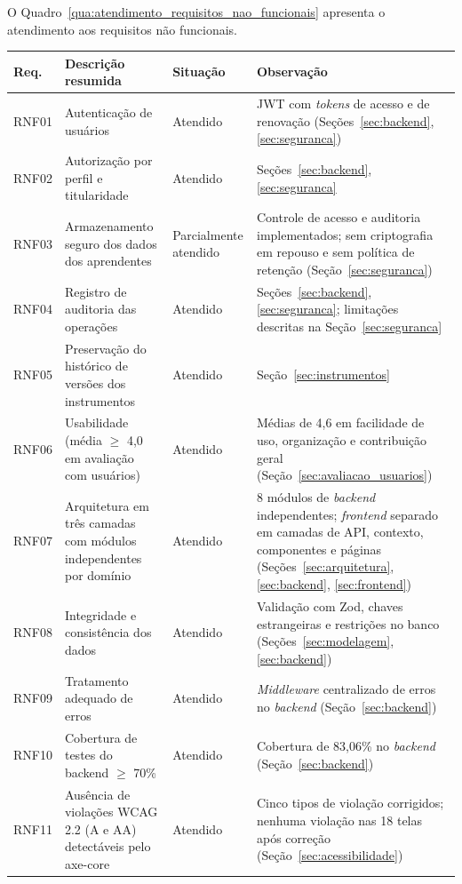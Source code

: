 O Quadro~\ref{qua:atendimento_requisitos_nao_funcionais} apresenta o atendimento aos requisitos não funcionais.

\begin{quadro}[H]
\centering
\footnotesize
\caption{Atendimento aos requisitos não funcionais}
\begin{tabular}{|p{1.1cm}|p{6.2cm}|p{1.8cm}|p{4.8cm}|}
\hline
\textbf{Req.} & \textbf{Descrição resumida} & \textbf{Situação} & \textbf{Observação} \\
\hline
RNF01 & Autenticação de usuários & Atendido & JWT com \textit{tokens} de acesso e de renovação (Seções~\ref{sec:backend}, \ref{sec:seguranca}) \\ \hline
RNF02 & Autorização por perfil e titularidade & Atendido & Seções~\ref{sec:backend}, \ref{sec:seguranca} \\ \hline
RNF03 & Armazenamento seguro dos dados dos aprendentes & Parcial\-mente atendido & Controle de acesso e auditoria implementados; sem criptografia em repouso e sem política de retenção (Seção~\ref{sec:seguranca}) \\ \hline
RNF04 & Registro de auditoria das operações & Atendido & Seções~\ref{sec:backend}, \ref{sec:seguranca}; limitações descritas na Seção~\ref{sec:seguranca} \\ \hline
RNF05 & Preservação do histórico de versões dos instrumentos & Atendido & Seção~\ref{sec:instrumentos} \\ \hline
RNF06 & Usabilidade (média $\geq$ 4,0 em avaliação com usuários) & Atendido & Médias de 4,6 em facilidade de uso, organização e contribuição geral (Seção~\ref{sec:avaliacao_usuarios}) \\ \hline
RNF07 & Arquitetura em três camadas com módulos independentes por domínio & Atendido & 8 módulos de \textit{backend} independentes; \textit{frontend} separado em camadas de API, contexto, componentes e páginas (Seções~\ref{sec:arquitetura}, \ref{sec:backend}, \ref{sec:frontend}) \\ \hline
RNF08 & Integridade e consistência dos dados & Atendido & Validação com Zod, chaves estrangeiras e restrições no banco (Seções~\ref{sec:modelagem}, \ref{sec:backend}) \\ \hline
RNF09 & Tratamento adequado de erros & Atendido & \textit{Middleware} centralizado de erros no \textit{backend} (Seção~\ref{sec:backend}) \\ \hline
RNF10 & Cobertura de testes do backend $\geq$ 70\% & Atendido & Cobertura de 83,06\% no \textit{backend} (Seção~\ref{sec:backend}) \\ \hline
RNF11 & Ausência de violações WCAG 2.2 (A e AA) detectáveis pelo axe-core & Atendido & Cinco tipos de violação corrigidos; nenhuma violação nas 18 telas após correção (Seção~\ref{sec:acessibilidade}) \\ \hline
\end{tabular}
\label{qua:atendimento_requisitos_nao_funcionais}
\end{quadro}

